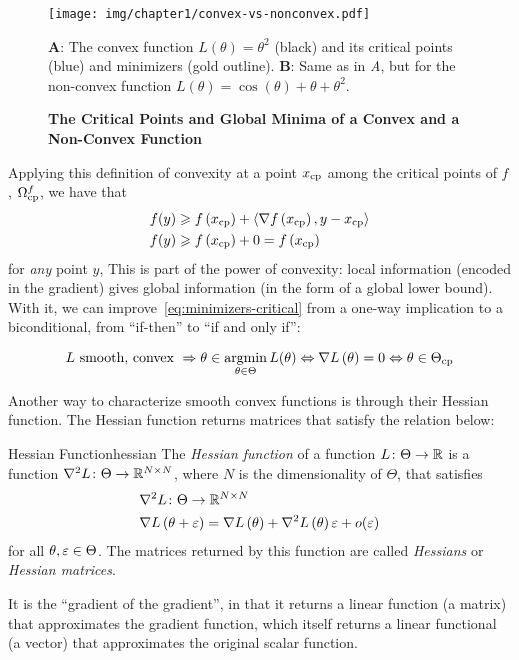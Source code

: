 \documentclass[../../thesis.tex]{subfiles}
\begin{document}
\begin{figure}[ht]
	\begin{center}
		\texttt{[image: img/chapter1/convex-vs-nonconvex.pdf]}
	\end{center}
	\caption{\textbf{The Critical Points and Global Minima
	of a Convex and a Non-Convex Function}}{\textbf{A}:
	The convex function $L(\theta) = \theta^2$ (black)
	and its critical points (blue)
	and minimizers (gold outline).
	\textbf{B}:
	Same as in \emph{A}, but for the non-convex function
	$L(\theta) = \cos(\theta) + \theta +\theta^2$.}
\end{figure}

Applying this definition of convexity at a point $x_{\mathrm{cp}}$
among the critical points of $f$, $\Omega^f_{\mathrm{cp}}$,
we have that
\begin{align}
	f(y) &\geqslant f\left(x_{\mathrm{cp}}\right) + \langle\nabla f\left(x_{\mathrm{cp}}\right), y - x_{\mathrm{cp}} \rangle\\
	f(y) &\geqslant f\left(x_{\mathrm{cp}}\right) + 0 = f\left(x_{\mathrm{cp}}\right)
\end{align}
for \emph{any} point $y$,
This is part of the power of convexity:
local information (encoded in the gradient)
gives global information (in the form of a global lower bound).
With it, we can improve~\ref{eq:minimizers-critical}
from a one-way implication to a biconditional,
from \enquote{if-then} to
\enquote{if and only if}:

\begin{equation}\equationlabel{convexity-critical}
	L \text{\ smooth, convex\ } \Rightarrow\\
	\theta \in \argmin_{\theta \in \Theta} L(\theta) \Leftrightarrow \grad{L}{\theta} = 0 \Leftrightarrow \theta \in \Theta_{\cp}
\end{equation}

Another way to characterize smooth convex functions is through their Hessian function.
The Hessian function returns matrices that satisfy the relation below:
\begin{definition}{Hessian Function}{hessian}
	The \emph{Hessian function} of a function $L \colon \Theta \to \mathbb{R}$
	is a function $\nabla^2{L} \colon \Theta \to \mathbb{R}^{N\times N}$,
	where $N$ is the dimensionality of $\Theta$,
	that satisfies
	\begin{align}
		&\nabla^2{L}\from \Theta \to \R^{N\times N}\\
		&\grad{L}{\theta + \eps} = \grad{L}{\theta} + \hess{L}{\theta}\eps + o(\eps)\equationlabel{def-hess}
	\end{align}
	for all $\theta, \varepsilon \in \Theta$.
	The matrices returned by this function are called \emph{Hessians}
	or \emph{Hessian matrices}.
\end{definition}
It is the \enquote{gradient of the gradient},
in that it returns a linear function (a matrix)
that approximates the gradient function,
which itself returns a linear functional (a vector)
that approximates the original scalar function.
\end{document}
